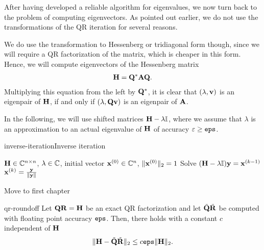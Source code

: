 \begin{intro}
  After having developed a reliable algorithm for eigenvalues, we now
  turn back to the problem of computing eigenvectors. As pointed out
  earlier, we do not use the transformations of the QR iteration for
  several reasons.

  We do use the transformation to Hessenberg or tridiagonal form
  though, since we will require a QR factorization of the matrix,
  which is cheaper in this form. Hence, we will compute eigenvectors
  of the Hessenberg matrix
  \begin{gather}
    \mathbf H = \mathbf Q^* \mathbf A \mathbf Q.
  \end{gather}
  Multiplying this equation from the left by $\mathbf Q^*$, it is clear
  that $(\lambda,\mathbf v)$ is an eigenpair of $\mathbf H$, if and only if
  $(\lambda,\mathbf Q\mathbf v)$ is an eigenpair of $\mathbf A$.

  In the following, we will use shifted matrices $\mathbf H-\lambda\mathbb I$,
  where we assume that $\lambda$ is an approximation to an actual
  eigenvalue of $\mathbf H$ of accuracy $\varepsilon\ge \texttt{eps}$.
\end{intro}

\begin{Algorithm*}{inverse-iteration}{Inverse iteration}
    \begin{algorithmic}[1]
    \Require $\mathbf H\in\mathbb C^{n\times n}$, $\lambda\in\mathbb C$, initial vector $\mathbf x^{(0)}\in\mathbb C^n$, $\lVert\mathbf x^{(0)}\rVert_2 = 1$
    \State Solve $(\mathbf H-\lambda\mathbb I) \mathbf y = \mathbf x^{(k-1)}$
    \State $\mathbf x^{(k)} = \frac{\mathbf y}{\lVert\mathbf y\rVert}$
    \EndFor
  \end{algorithmic}
\end{Algorithm*}

\begin{todo}
  Move to first chapter
\end{todo}

\begin{Lemma}{qr-roundoff}
  Let $\mathbf Q\mathbf R=\mathbf H$ be an exact QR factorization and let
  $\tilde {\mathbf Q}\tilde{\mathbf R}$ be computed with floating point accuracy
  $\texttt{eps}$. Then, there holds with a constant $c$ independent of $\mathbf H$
  \begin{gather}
    \lVert\mathbf H-\tilde{\mathbf Q}\tilde{\mathbf R}\rVert_2 \le c \texttt{eps} \lVert\mathbf H\rVert_2.
  \end{gather}
\end{Lemma}

